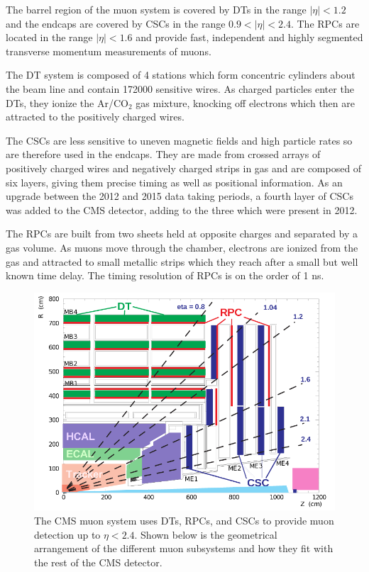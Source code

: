 The barrel region of the muon system is covered by DTs
 in the range $|\eta|<1.2$ and the endcaps are covered 
 by CSCs in the range $0.9<|\eta|<2.4$.
The RPCs are located
 in the range $|\eta|<1.6$ and provide fast,
 independent and highly segmented transverse
 momentum measurements of muons. 

The DT system is composed of 4 stations which 
 form concentric cylinders about the beam line
 and contain 172000 sensitive wires. 
As charged particles enter the DTs,
 they ionize the Ar/CO$_2$ gas mixture,
 knocking off electrons  which 
 then are attracted to the positively charged wires.

The CSCs are less sensitive to uneven magnetic fields
 and high particle rates so are therefore used in the endcaps.
They are made from crossed arrays of positively 
 charged wires and negatively charged strips
 in gas and are composed
 of six layers, giving them precise timing
 as well as positional information. 
As an upgrade between the 2012 and 2015 data taking periods,
 a fourth layer of CSCs was added to the CMS detector, 
 adding to the three which were present in 2012.

The RPCs are built from two sheets held at opposite
 charges and separated by a gas volume.
As muons move through the chamber, electrons
 are ionized from the gas and attracted to small
 metallic strips which they reach after a small
 but well known time delay. 
The timing resolution of RPCs is on the order of 1 ns. 

\begin{figure}[tb]
\caption[The CMS Muon System]{
 The CMS muon system uses DTs, RPCs,
  and CSCs to provide muon detection
  up to $\eta < 2.4$.
 Shown below is the geometrical arrangement
  of the different muon
  subsystems and how they fit with
  the rest of the CMS detector.
 }
\label{fig:muon}
\includegraphics[width=\textwidth]{pdfs/experiment/cms_muon.png}
\end{figure}
 


